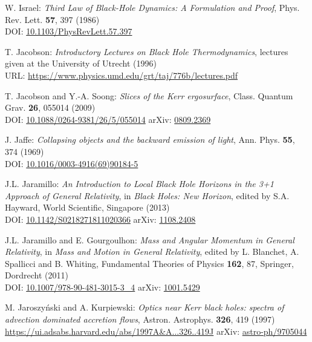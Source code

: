 \begin{thebibliography}{123}
W. Israel: {\em Third Law of Black-Hole Dynamics: A Formulation and Proof},
Phys. Rev. Lett. {\bf 57}, 397 (1986)\\
DOI: \href{https://doi.org/10.1103/PhysRevLett.57.397}{10.1103/PhysRevLett.57.397}

T. Jacobson:
{\em Introductory Lectures on Black Hole Thermodynamics},
lectures given at the University of Utrecht (1996)\\
URL: \url{https://www.physics.umd.edu/grt/taj/776b/lectures.pdf}

T. Jacobson and Y.-A. Soong:
{\em Slices of the Kerr ergosurface},
Class. Quantum Grav. {\bf 26}, 055014 (2009)\\
DOI: \href{https://doi.org/10.1088/0264-9381/26/5/055014}{10.1088/0264-9381/26/5/055014}\hfill
arXiv: \href{https://arxiv.org/abs/0809.2369}{0809.2369}

J. Jaffe:
{\em Collapsing objects and the backward emission of light},
Ann. Phys. {\bf 55}, 374 (1969)\\
DOI: \href{https://doi.org/10.1016/0003-4916(69)90184-5}{10.1016/0003-4916(69)90184-5}

J.L. Jaramillo: {\em An Introduction to Local Black Hole Horizons in the 3+1
Approach of General Relativity}, in {\em Black Holes: New Horizon}, edited
by S.A. Hayward, World Scientific, Singapore (2013)\\
DOI: \href{https://doi.org/10.1142/S0218271811020366}{10.1142/S0218271811020366}\hfill
arXiv: \href{https://arxiv.org/abs/1108.2408}{1108.2408}

J.L. Jaramillo and E. Gourgoulhon:
{\em Mass and Angular Momentum in General Relativity},
in \emph{Mass and Motion in General Relativity}, edited by L. Blanchet, A. Spallicci and B. Whiting, Fundamental Theories of Physics {\bf 162}, 87,
Springer, Dordrecht (2011) \\
DOI: \href{https://doi.org/10.1007/978-90-481-3015-3_4}{10.1007/978-90-481-3015-3\_4}\hfill
arXiv: \href{https://arxiv.org/abs/1001.5429}{1001.5429}

M. Jaroszy\'nski and A. Kurpiewski:
{\em Optics near Kerr black holes: spectra of advection dominated accretion flows},
Astron. Astrophys. {\bf 326}, 419 (1997)\\
\url{https://ui.adsabs.harvard.edu/abs/1997A&A...326..419J}\hfill
arXiv: \href{https://arxiv.org/abs/astro-ph/9705044}{astro-ph/9705044}


\end{thebibliography}
